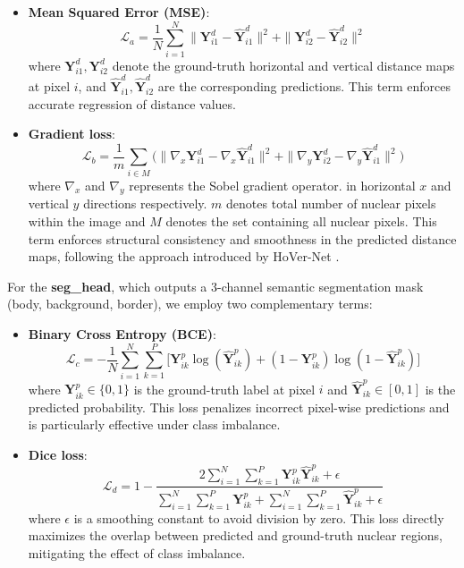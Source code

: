 \documentclass[target=bach,aauheader=,style=]{thud}
\begin{document}
\begin{itemize}
    \item \textbf{Mean Squared Error (MSE)}:  
    \begin{equation}
        \mathcal{L}_a = \frac{1}{N} \sum_{i=1}^{N} \| \mathbf{Y}^d_{i1} - \widehat{\mathbf{Y}}^d_{i1} \|^2 + \| \mathbf{Y}^d_{i2} - \widehat{\mathbf{Y}}^d_{i2} \|^2
    \end{equation}
    where $\mathbf{Y}^d_{i1}, \mathbf{Y}^d_{i2}$ denote the ground-truth horizontal and vertical distance maps at pixel $i$, and $\widehat{\mathbf{Y}}^d_{i1}, \widehat{\mathbf{Y}}^d_{i2}$ are the corresponding predictions. 
    This term enforces accurate regression of distance values. 
    
    \item \textbf{Gradient loss}:  
    \begin{equation}
        \mathcal{L}_b = \frac{1}{m} \sum_{i\in M} 
        \big( \| \nabla_x \mathbf{Y}^d_{i1} - \nabla_x \widehat{\mathbf{Y}}^d_{i1} \|^2 + \| \nabla_y \mathbf{Y}^d_{i2} - \nabla_y \widehat{\mathbf{Y}}^d_{i1} \|^2 \big)
    \end{equation}
    where $\nabla_x$ and $\nabla_y$ represents the Sobel gradient operator. in horizontal $x$ and vertical $y$ directions respectively. $m$ denotes total number of nuclear pixels within the image and $M$ denotes the set containing all nuclear pixels.
    This term enforces structural consistency and smoothness in the predicted distance maps, following the approach introduced by HoVer-Net \cite{graham2019hovernet}.
\end{itemize}

For the \textbf{seg\_head}, which outputs a 3-channel semantic segmentation mask (body, background, border), we employ two complementary terms: 

\begin{itemize}
    \item \textbf{Binary Cross Entropy (BCE)}:  
    \begin{equation}
        \mathcal{L}_c = - \frac{1}{N} \sum_{i=1}^{N} \sum_{k=1}^{P}\Big[ \mathbf{Y}^p_{ik}\log(\widehat{\mathbf{Y}}^p_{ik}) + (1 - \mathbf{Y}^p_{ik}) \log(1 - \widehat{\mathbf{Y}}^p_{ik}) \Big]
    \end{equation}
    where $\mathbf{Y}^p_{ik} \in \{0,1\}$ is the ground-truth label at pixel $i$ and $\widehat{\mathbf{Y}}^p_{ik} \in [0,1]$ is the predicted probability. 
    This loss penalizes incorrect pixel-wise predictions and is particularly effective under class imbalance. 
    
    \item \textbf{Dice loss}:  
    \begin{equation}
        \mathcal{L}_d = 1 - \frac{2 \sum_{i=1}^{N} \sum_{k=1}^{P} \mathbf{Y}^p_{ik} \widehat{\mathbf{Y}}^p_{ik} + \epsilon}{\sum_{i=1}^{N} \sum_{k=1}^{P} \mathbf{Y}^p_{ik} + \sum_{i=1}^{N} \sum_{k=1}^{P} \widehat{\mathbf{Y}}^p_{ik} + \epsilon}
    \end{equation}
    where $\epsilon$ is a smoothing constant to avoid division by zero. 
    This loss directly maximizes the overlap between predicted and ground-truth nuclear regions, mitigating the effect of class imbalance.
\end{itemize}
\end{document}
